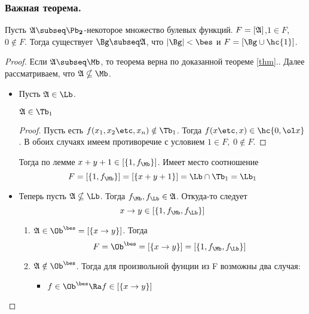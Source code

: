 \documentclass[unicode,10pt]{article}
\begin{document}
\subsubsection{Важная теорема.}
\begin{theorem}
  Пусть $\ag\subseq\PD$-некоторое множество булевых функций. $F=[\mathfrak{A}]$,$1\in F$,$0\notin F$.
  Тогда существует $\Bg\subseq\ag$, что $|\Bg|<\bes$ и $F=[\Bg\cup\hc{1}]$.
\end{theorem}
\begin{proof}
  Если $\ag\subseq\Mb$, то теорема верна по доказанной теореме \ref{thm}.\REF. Далее рассматриваем,
  что $\ag\nsubseq\Mb$.
  \begin{itemize}
    \item Пусть $\ag\in\Lb$.
      \begin{stm}
        \begin{math}
          \ag\in\Tb_1
        \end{math}
      \end{stm}
      \begin{proof}
        Пусть есть $f(\set[x]{n})\notin\Tb_1$. Тогда $f(x\etc,x)\in\hc{0,\ol x}$.
        В обоих случаях имеем противоречие с условием $1\in F,\;0\notin F$.
      \end{proof}
      Тогда по лемме \REF $x+y+1\in\cls{1,\fM}$. Имеет место соотношение \WHY
      \begin{displaymath}
        F=\cls{1,\fM}=\cls{x+y+1}=\Lb\cap\Tb_1=\Lb_1
      \end{displaymath}
    \item Теперь пусть $\ag\nsubseq\Lb$. Тогда $\fM,\fL\in\ag$. Откуда-то следует \WHY
      \begin{displaymath}
        x\to y\in\cls{1,\fM,\fL}
      \end{displaymath}
      \begin{enumerate}
        \item $\ag\in\Oib=\cls{x\to y}$. Тогда
          \begin{displaymath}
            F=\Oib=\cls{x\to y}=\cls{1,\fM,\fL}
          \end{displaymath}
        \item $\ag\notin\Oib$. Тогда для произвольной фунции из F возможны два случая:
          \begin{itemize}
            \item
              \begin{math}
                f\in\Oib \Ra f\in\cls{x\to y}
              \end{math}

\end{itemize}
\end{enumerate}
\end{itemize}
\end{proof}
\end{document}
